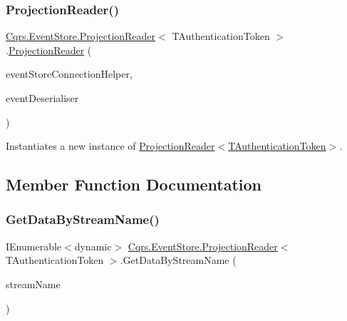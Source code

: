 \subsubsection{\texorpdfstring{Projection\+Reader()}{ProjectionReader()}}
{\footnotesize\ttfamily \hyperlink{classCqrs_1_1EventStore_1_1ProjectionReader}{Cqrs.\+Event\+Store.\+Projection\+Reader}$<$ T\+Authentication\+Token $>$.\hyperlink{classCqrs_1_1EventStore_1_1ProjectionReader}{Projection\+Reader} (\begin{DoxyParamCaption}\item[{\hyperlink{interfaceCqrs_1_1EventStore_1_1IEventStoreConnectionHelper}{I\+Event\+Store\+Connection\+Helper}}]{event\+Store\+Connection\+Helper,  }\item[{\hyperlink{interfaceCqrs_1_1EventStore_1_1IEventDeserialiser}{I\+Event\+Deserialiser}$<$ T\+Authentication\+Token $>$}]{event\+Deserialiser }\end{DoxyParamCaption})\hspace{0.3cm}{\ttfamily [protected]}}



Instantiates a new instance of \hyperlink{classCqrs_1_1EventStore_1_1ProjectionReader_a87d5f996f75577bb6ae18704c9a590a2_a87d5f996f75577bb6ae18704c9a590a2}{Projection\+Reader$<$\+T\+Authentication\+Token$>$}. 



\subsection{Member Function Documentation}
\mbox{\label{classCqrs_1_1EventStore_1_1ProjectionReader_adcc229abde429acfa6b125b3a93a85b4_adcc229abde429acfa6b125b3a93a85b4}} 
\subsubsection{\texorpdfstring{Get\+Data\+By\+Stream\+Name()}{GetDataByStreamName()}}
{\footnotesize\ttfamily I\+Enumerable$<$dynamic$>$ \hyperlink{classCqrs_1_1EventStore_1_1ProjectionReader}{Cqrs.\+Event\+Store.\+Projection\+Reader}$<$ T\+Authentication\+Token $>$.Get\+Data\+By\+Stream\+Name (\begin{DoxyParamCaption}\item[{string}]{stream\+Name }\end{DoxyParamCaption})\hspace{0.3cm}{\ttfamily [protected]}}



